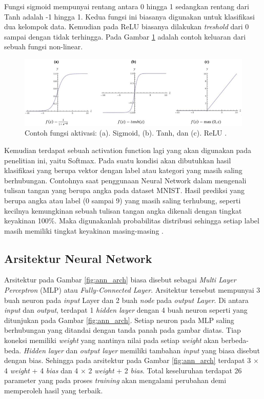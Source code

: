 Fungsi sigmoid mempunyai rentang antara 0 hingga 1 sedangkan rentang dari Tanh adalah -1 hingga 1. Kedua fungsi ini biasanya digunakan untuk klasifikasi dua kelompok data. Kemudian pada ReLU biasanya dilakukan \textit{treshold} dari 0 sampai dengan tidak terhingga. Pada Gambar \ref{fig:ann_non_linear} adalah contoh keluaran dari sebuah fungsi non-linear.
\vspace{1ex}

\begin{figure} [!h] \centering
	\includegraphics[scale=0.68]{img/ann_non_linear.png}
	\caption{Contoh fungsi aktivasi: (a). Sigmoid, (b). Tanh, dan (c). ReLU \citep{buduma2017}.}
	\label{fig:ann_non_linear}
\end{figure}

Kemudian terdapat sebuah activation function lagi yang akan digunakan pada penelitian ini, yaitu Softmax. Pada suatu kondisi akan dibutuhkan hasil klasifikasi yang berupa vektor dengan label atau kategori yang masih saling berhubungan. Contohnya saat penggunaan Neural Network dalam mengenali tulisan tangan yang berupa angka pada dataset MNIST. Hasil prediksi yang berupa angka atau label (0 sampai 9) yang masih saling terhubung, seperti kecilnya kemungkinan sebuah tulisan tangan angka dikenali dengan tingkat keyakinan 100\%. Maka digunakanlah probabilitas distribusi sehingga setiap label masih memiliki tingkat keyakinan masing-masing \citep{buduma2017}.
\vspace{1ex}

\subsection{Arsitektur Neural Network}
\label{sec:sub_sec2_nn_arch}

Arsitektur pada Gambar \ref{fig:ann_arch} biasa disebut sebagai \textit{Multi Layer Perceptron} (MLP) atau \textit{Fully-Connected Layer}. Arsitektur tersebut mempunyai 3 buah neuron pada \textit{input} Layer dan 2 buah \textit{node} pada \textit{output Layer}. Di antara \textit{input} dan \textit{output}, terdapat 1 \textit{hidden layer} dengan 4 buah neuron seperti yang ditunjukan pada Gambar \ref{fig:ann_arch}. Setiap neuron pada MLP saling berhubungan yang ditandai dengan tanda panah pada gambar diatas. Tiap koneksi memiliki \textit{weight} yang nantinya nilai pada setiap \textit{weight} akan berbeda-beda. \textit{Hidden layer} dan \textit{output layer} memiliki tambahan \textit{input} yang biasa disebut dengan bias. Sehingga pada arsitektur pada Gambar \ref{fig:ann_arch} terdapat 3 $\times$ 4 \textit{weight} + 4 \textit{bias} dan 4 $\times$ 2 \textit{weight} + 2 \textit{bias}. Total keseluruhan terdapat 26 parameter yang pada proses \textit{training} akan mengalami perubahan demi memperoleh hasil yang terbaik.
\vspace{1ex}

